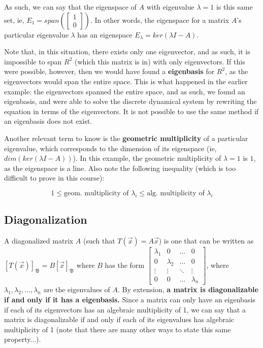 \documentclass[12pt]{article}
\begin{document}
{As such, we can say that the eigenspace of $A$ with eigenvalue $\lambda = 1$ is this same set, ie, $E_1=span(\begin{bmatrix}
    1\\
    0\end{bmatrix})$. In other words, the eigenspace for a matrix $A$'s particular eigenvalue $\lambda$ has an eigenspace $E_\lambda = ker(\lambda I - A)$.

Note that, in this situation, there exists only one eigenvector, and as such, it is impossible to span $R^2$ (which this matrix is in) with only eigenvectors. If this were possible, however, then we would have found a \textbf{eigenbasis} for $R^2$, as the eigenvectors would span the entire space. This is what happened in the earlier example: the eigenvectors spanned the entire space, and as such, we found an eigenbasis, and were able to solve the discrete dynamical system by rewriting the equation in terms of the eigenvectors. It is not possible to use the same method if an eigenbasis does not exist.

Another relevant term to know is the \textbf{geometric multiplicity} of a particular eigenvalue, which corresponds to the dimension of its eigenspace (ie, $dim(ker(\lambda I - A))$). In this example, the geometric multiplicity of $\lambda = 1$ is $1$, as the eigenspace is a line. Also note the following inequality (which is too difficult to prove in this course):

\begin{equation}
    1 \leq \text{geom. multiplicity of } \lambda_i \leq \text{alg. multiplicity of } \lambda_i
\end{equation}


\subsection{Diagonalization}

A diagonalized matrix $A$ (such that $T(\vec{x}) = A\vec{x}$) is one that can be written as $[T(\vec{x})]_{\mathfrak{B}} = B[\vec{x}]_{\mathfrak{B}}$ where $B$ has the form $\begin{bmatrix}
    \lambda_1 & 0 & \dots & 0\\
    0 & \lambda_2 & \dots & 0\\
    \vdots & \vdots & \ddots & \vdots\\
    0 & 0 & \dots & \lambda_n
\end{bmatrix}$, where $\lambda_1, \lambda_2, \dots, \lambda_n$ are the eigenvalues of $A$. By extension, \textbf{a matrix is diagonalizable if and only if it has a eigenbasis.} Since a matrix can only have an eigenbasis if each of its eigenvectors has an algebraic multiplicity of 1, we can say that a matrix is diagonalizable if and only if each of its eigenvalues has algebraic multiplicity of 1 (note that there are many other ways to state this same property...).

}
\end{document}
